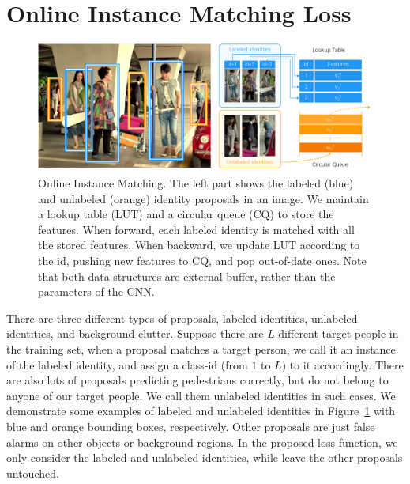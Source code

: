 \section{Online Instance Matching Loss} %
\label{sec:ps-oim-loss}
\begin{figure}[t]
\begin{center}
\includegraphics[width=1.0\linewidth]{figures/person_search/oim.pdf}
\end{center}
\caption{Online Instance Matching. The left part shows the labeled (blue) and unlabeled (orange) identity proposals in an image. We maintain a lookup table (LUT) and a circular queue (CQ) to store the features. When forward, each labeled identity is matched with all the stored features. When backward, we update LUT according to the id, pushing new features to CQ, and pop out-of-date ones. Note that both data structures are external buffer, rather than the parameters of the CNN.}
\label{fig:ps-oim}
\end{figure}

There are three different types of proposals, labeled identities, unlabeled identities, and background clutter. Suppose there are $L$ different target people in the training set, when a proposal matches a target person, we call it an instance of the labeled identity, and assign a class-id (from $1$ to $L$) to it accordingly. There are also lots of proposals predicting pedestrians correctly, but do not belong to anyone of our target people. We call them unlabeled identities in such cases. We demonstrate some examples of labeled and unlabeled identities in Figure~\ref{fig:ps-oim} with blue and orange bounding boxes, respectively. Other proposals are just false alarms on other objects or background regions. In the proposed loss function, we only consider the labeled and unlabeled identities, while leave the other proposals untouched.

